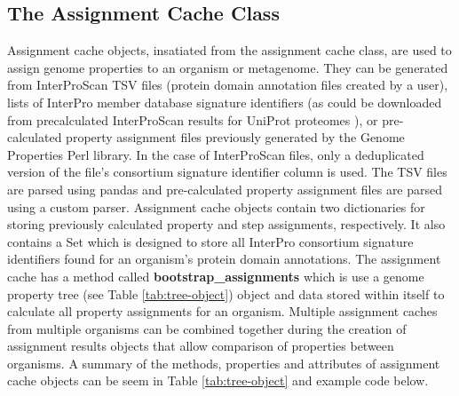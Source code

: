 \subsection{The Assignment Cache Class}

Assignment cache objects, insatiated from the assignment cache class, are used to assign genome properties to an organism or metagenome. They can be generated from InterProScan TSV files (protein domain annotation files created by a user), lists of InterPro member database signature identifiers (as could be downloaded from precalculated InterProScan results for UniProt proteomes \cite{uniprot2014uniprot}), or pre-calculated property assignment files previously generated by the Genome Properties Perl library. In the case of InterProScan files, only a deduplicated version of the file's consortium signature identifier column is used. The TSV files are parsed using pandas and pre-calculated property assignment files are parsed using a custom parser. Assignment cache objects contain two dictionaries for storing previously calculated property and step assignments, respectively. It also contains a Set which is designed to store all InterPro consortium signature identifiers found for an organism's protein domain annotations. The assignment cache has a method called \textbf{bootstrap\_assignments} which is use a genome property tree (see Table \ref{tab:tree-object}) object and data stored within itself to calculate all property assignments for an organism. Multiple assignment caches from multiple organisms can be combined together during the creation of assignment results objects that allow comparison of properties between organisms. A summary of the methods, properties and attributes of assignment cache objects can be seem in Table \ref{tab:tree-object} and example code below.

